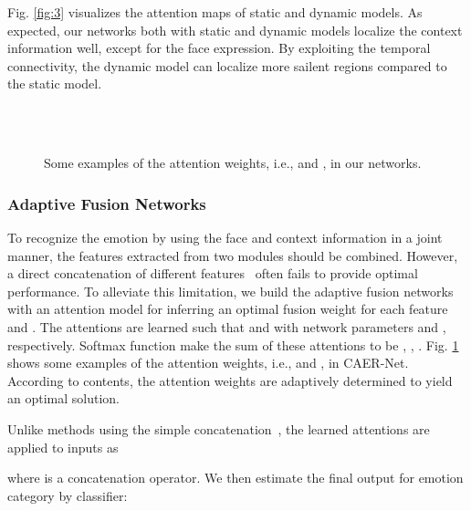 \documentclass[10pt,twocolumn,letterpaper]{article}
\newcommand{\figref}[1]{Fig. \ref{#1}}
\begin{document}
\figref{fig:3} visualizes the attention maps of static and dynamic models. As expected, our networks both with static and dynamic models localize the context information well, except for the face expression.
By exploiting the temporal connectivity, the dynamic model can localize more sailent regions compared to the static model.


\begin{figure}
	\centering
	\renewcommand{\thesubfigure}{}
	\hfill
	\hfill
	\hfill \\
	\vspace{-5pt}
	\hfill
	\hfill
	\hfill \\
	\caption{Some examples of the attention weights, i.e.,  and , in our networks.}
	\label{fig:4}\vspace{-10pt}
\end{figure}


\subsubsection{Adaptive Fusion Networks}\vspace{-5pt}
To recognize the emotion by using the face and context information in a joint manner, the features extracted from two modules should be combined.
However, a direct concatenation of different features~\cite{kosti2017emotion} often fails to provide optimal performance.
To alleviate this limitation, we build the adaptive fusion networks with an attention model for inferring an optimal fusion weight for each feature  and .
The attentions are learned such that  and  with network parameters  and , respectively. Softmax function make the sum of these attentions to be , \ie, .
\figref{fig:4} shows some examples of the attention weights, i.e.,  and , in CAER-Net. According to contents, the attention weights are adaptively determined to yield an optimal solution.

Unlike methods using the simple concatenation~\cite{kosti2017emotion}, the learned attentions are applied to inputs as

where  is a concatenation operator.
We then estimate the final output  for emotion category by classifier:
\end{document}
